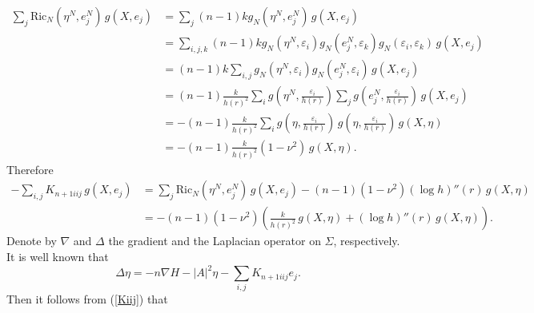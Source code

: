 \documentclass[amssymb,amstex,amsmath,11pt]{article}
\numberwithin{equation}{section}
\renewcommand{\epsilon}{\varepsilon}
\theoremstyle{plain}
\theoremstyle{definition}
\theoremstyle{remark}
\newcommand{\lap}{\Delta}
\def\Ricn{\textrm{Ric}_N}
\begin{document}
\begin{align}\label{5.5}
    \sum_j \Ricn  \left(\eta^N,e_j^N\right)\,g(X,e_j)
    & = \sum_j(n-1) k g_N\left(\eta^N,e_j^N\right)\,g(X,e_j) \nonumber \\
    & = \sum_{i,j,k} (n-1)k g_N\left(\eta^N,\epsilon_i\right) g_N\left(e_j^N,\epsilon_k\right) g_N(\epsilon_i,\epsilon_k) \, g(X,e_j) \nonumber \\
    & = (n-1)k \sum_{i,j} g_N\left(\eta^N,\epsilon_i\right) g_N\left(e_j^N,\epsilon_i\right)\,g(X,e_j) \nonumber \\
    & = (n-1)\frac{k}{h(r)^2} \sum_{i} g\left(\eta^N,\frac{\epsilon_i}{h(r)}\right) \sum_{j} g\left(e_j^N,\frac{\epsilon_i}{h(r)}\right)\, g(X,e_j)  \nonumber \\
    & = -(n-1)\frac{k}{h(r)^2}\sum_{i} g\left(\eta,\frac{\epsilon_i}{h(r)}\right) \, g\left(\eta,\frac{\epsilon_i}{h(r)}\right)\,g(X,\eta) \nonumber \\
    & = -(n-1)\frac{k}{h(r)^2}(1-\nu^2)\,g(X,\eta).
\end{align}
Therefore
\begin{align}\label{Kiij}
    -\sum_{i,j}K_{n+1iij}\,g(X,e_j)
    & = \sum_j \Ricn\left(\eta^N,e_j^N\right) \, g(X,e_j) - (n-1)(1-\nu^2)(\log h)''(r) \, g(X,\eta) \nonumber\\
    & = -(n-1)(1-\nu^2)\left(\frac{k}{h(r)^2} \, g(X,\eta) + (\log h)''(r) \, g(X,\eta)\right).
\end{align}
Denote by $\nabla$ and $\Delta$ the gradient and the Laplacian operator on $\Sigma$, respectively. It is well known that
$$\lap \eta = -n\nabla H - |A|^2\eta - \sum_{i,j}K_{n+1iij}e_j.$$
Then it follows from (\ref{Kiij}) that
\end{document}
